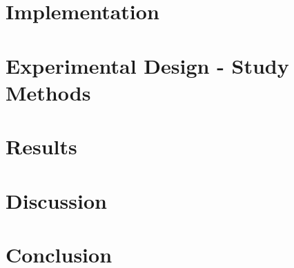 \section{Implementation}\label{sec:implementation}

\section{Experimental Design - Study Methods}\label{sec:ed}
\section{Results}\label{sec:results}
\section{Discussion}\label{sec:discussions}
\section{Conclusion}\label{sec:conclusions}




